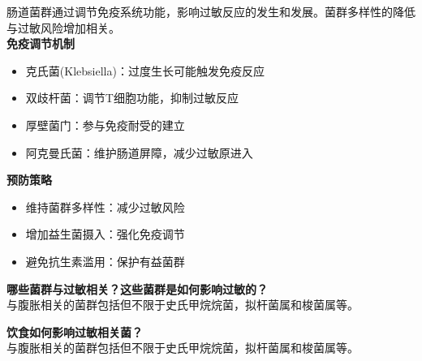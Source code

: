 \documentclass[UTF8]{ctexart}
\begin{document}
\begin{tcolorbox}[
    enhanced,
    colback=customTealBg,
    colframe=customTealBg,
    arc=3mm,
    boxrule=0pt,
    width=\textwidth,
    top=8pt,
    bottom=8pt
]
{\small{\color{customTeal}\faInfoCircle}
肠道菌群通过调节免疫系统功能，影响过敏反应的发生和发展。菌群多样性的降低与过敏风险增加相关。\\

\textbf{免疫调节机制}
\begin{itemize}[]
\item 克氏菌(Klebsiella)：过度生长可能触发免疫反应
\item 双歧杆菌：调节T细胞功能，抑制过敏反应
\item 厚壁菌门：参与免疫耐受的建立
\item 阿克曼氏菌：维护肠道屏障，减少过敏原进入
\end{itemize}

\textbf{预防策略}
\begin{itemize}[]
\item 维持菌群多样性：减少过敏风险
\item 增加益生菌摄入：强化免疫调节
\item 避免抗生素滥用：保护有益菌群
\end{itemize}
}
\end{tcolorbox}

\begin{tcolorbox}[
    enhanced,
    colback=lightpurple!10, %
    colframe=lightpurple!10,  %
    arc=3mm,
    boxrule=0.5pt,
    width=\textwidth,
    top=8pt,
    bottom=8pt
]
{\small{\color{lightpurple}\faQuestionCircle}\quad \textbf{哪些菌群与过敏相关？这些菌群是如何影响过敏的？}\\
{\color{orange!50}\faComments}\quad 与腹胀相关的菌群包括但不限于史氏甲烷烷菌，拟杆菌属和梭菌属等。
}
\end{tcolorbox}

\begin{tcolorbox}[
    enhanced,
    colback=lightpurple!10, %
    colframe=lightpurple!10,  %
    arc=3mm,
    boxrule=0.5pt,
    width=\textwidth,
    top=8pt,
    bottom=8pt
]
{\small{\color{lightpurple}\faQuestionCircle}\quad \textbf{饮食如何影响过敏相关菌？}\\
{\color{orange!50}\faComments}\quad 与腹胀相关的菌群包括但不限于史氏甲烷烷菌，拟杆菌属和梭菌属等。
}
\end{tcolorbox}

\newpage
\end{document}
